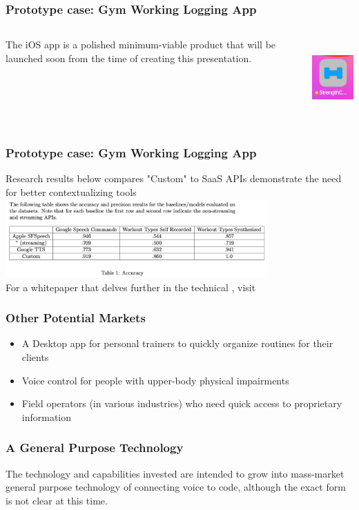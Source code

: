 \documentclass{beamer}
\begin{document}
\begin{frame}
\frametitle{Prototype case: Gym Working Logging App}
\begin{columns}
\begin{column}{0.5\textwidth}
The iOS app is a polished minimum-viable product that will be launched soon from the time of creating this presentation.
\end{column}
\begin{column}{0.5\textwidth}
    \centering
    \includegraphics[height=3cm]{images/sc_icon.png}
\end{column}
\end{columns}
\end{frame}

\begin{frame}
\frametitle{Prototype case: Gym Working Logging App}
Research results below compares "Custom" to SaaS APIs demonstrate the need for better contextualizing tools \\
\centering
\includegraphics[height=3cm]{images/preliminary_results.png} \\
For a whitepaper that delves further in the technical , visit 
\end{frame}

\begin{frame}
\frametitle{Other Potential Markets}
\begin{itemize}
    \item A Desktop app for personal trainers to quickly organize routines for their clients
    \item Voice control for people with upper-body physical impairments
    \item Field operators (in various industries) who need quick access to proprietary information
\end{itemize}
\end{frame}

\begin{frame}
\frametitle{A General Purpose Technology}
The technology and capabilities invested are intended to grow into mass-market general purpose technology of connecting voice to code, although the exact form is not clear at this time.
\end{frame}
\end{document}
